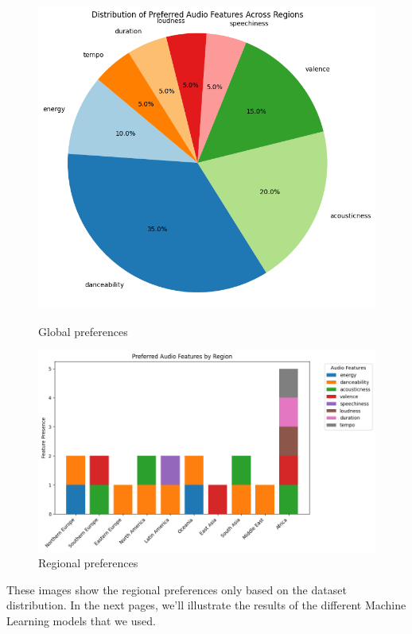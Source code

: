 \begin{figure}[H]
    \centering
    \begin{minipage}{0.45\textwidth}
        \centering
        \includegraphics[width=\textwidth]{media/features_preferences.png}  
        \caption{Global preferences}
    \end{minipage}
    \hfill
    \begin{minipage}{0.54\textwidth}
        \centering
        \includegraphics[width=\textwidth]{media/feature_preferences_regions.png}  
        \caption{Regional preferences}
    \end{minipage}
\end{figure}

These images show the regional preferences only based on the dataset distribution. In the next pages, we'll illustrate the results of the different Machine Learning models that we used.